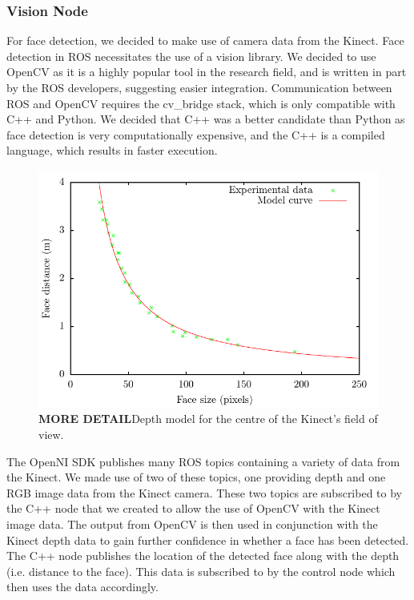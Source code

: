 \documentclass[conference]{IEEEtran}
\begin{document}
\subsubsection{Vision Node}
For face detection, we decided to make use of camera data from the Kinect. Face detection in ROS necessitates the use of a vision library. We decided to use OpenCV as it is a highly popular tool in the research field, and is written in part by the ROS developers, suggesting easier integration. Communication between ROS and OpenCV requires the cv\_bridge stack, which is only compatible with C++ and Python. We decided that C++ was a better candidate than Python as face detection is very computationally expensive, and the C++ is a compiled language, which results in faster execution.
\begin{figure}
  \includegraphics[width=\columnwidth]{centre_model}
  \caption{\textbf{MORE DETAIL}Depth model for the centre of the Kinect's field of view.}
  \label{fig:model}
\end{figure}
The OpenNI SDK publishes many ROS topics containing a variety of data from the Kinect. We made use of two of these topics, one providing depth and one RGB image data from the Kinect camera. These two topics are subscribed to by the C++ node that we created to allow the use of OpenCV with the Kinect image data. The output from OpenCV is then used in conjunction with the Kinect depth data to gain further confidence in whether a face has been detected. The C++ node publishes the location of the detected face along with the depth (i.e. distance to the face). This data is subscribed to by the control node which then uses the data accordingly.
\end{document}
